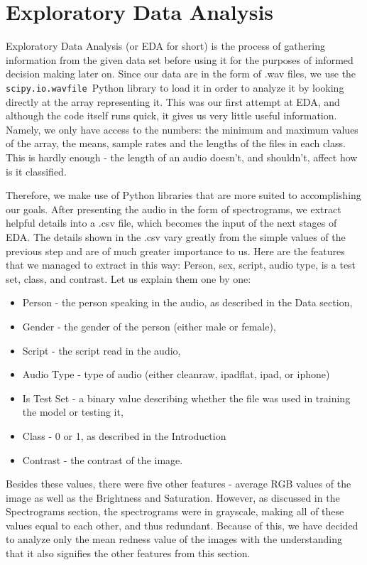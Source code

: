 \documentclass[11pt, letterpaper]{article}
\begin{document}
\section{Exploratory Data Analysis}

Exploratory Data Analysis (or EDA for short) is the process of gathering information from the given data set before using it for the purposes of informed decision making later on. Since our data are in the form of .wav files, we use the \verb | scipy.io.wavfile |Python library to load it in order to analyze it by looking directly at the array representing it. This was our first attempt at EDA, and although the code itself runs quick, it gives us very little useful information. Namely, we only have access to the numbers: the minimum and maximum values of the array, the means, sample rates and the lengths of the files in each class. This is hardly enough - the length of an audio doesn't, and shouldn't, affect how is it classified.

Therefore, we make use of Python libraries that are more suited to accomplishing our goals. After presenting the audio in the form of spectrograms, we extract helpful details into a .csv file, which becomes the input of the next stages of EDA. The details shown in the .csv vary greatly from the simple values of the previous step and are of much greater importance to us. Here are the features that we managed to extract in this way: Person, sex, script, audio type, is a test set, class, and contrast. Let us explain them one by one:
\begin{itemize}
    \item Person - the person speaking in the audio, as described in the Data section,
    \item Gender - the gender of the person (either male or female),
    \item Script - the script read in the audio,
    \item Audio Type - type of audio (either cleanraw, ipadflat, ipad, or iphone)
    \item Is Test Set - a binary value describing whether the file was used in training the model or testing it,
    \item Class - 0 or 1, as described in the Introduction
    \item Contrast - the contrast of the image.
\end{itemize}
Besides these values, there were five other features - average RGB values of the image as well as the Brightness and Saturation. However, as discussed in the Spectrograms section, the spectrograms were in grayscale, making all of these values equal to each other, and thus redundant. Because of this, we have decided to analyze only the mean redness value of the images with the understanding that it also signifies the other features from this section.
\end{document}
